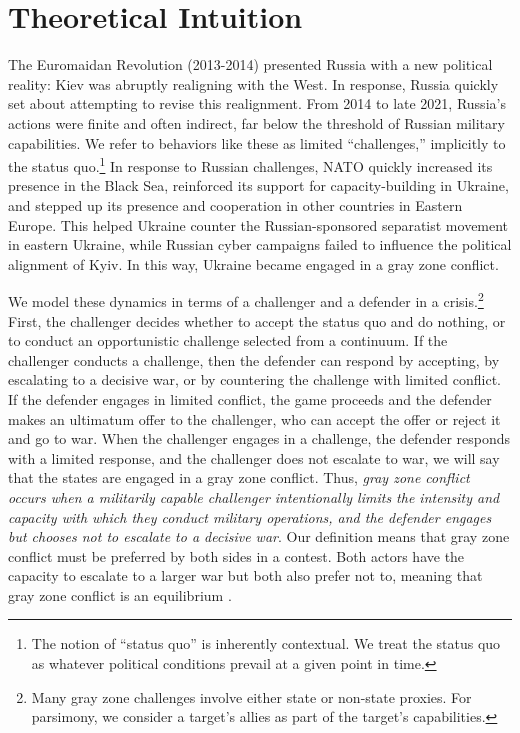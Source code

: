 \documentclass[11pt,letterpaper,pdftex,dvipsnames,table]{article}
\begin{document}
\section{Theoretical Intuition} \label{formalintutition}
The Euromaidan Revolution (2013-2014) presented Russia with a new political reality: Kiev was abruptly realigning with the West. In response, Russia quickly set about attempting to revise this realignment. From 2014 to late 2021, Russia's actions were finite and often indirect, far below the threshold of Russian military capabilities. We refer to behaviors like these as limited ``challenges,'' implicitly to the status quo.\footnote{The notion of ``status quo'' is inherently contextual. We treat the status quo as whatever political conditions prevail at a given point in time.} In response to Russian challenges, NATO quickly increased its presence in the Black Sea, reinforced its support for capacity-building in Ukraine, and stepped up its presence and cooperation in other countries in Eastern Europe. This helped Ukraine counter the Russian-sponsored separatist movement in eastern Ukraine, while Russian cyber campaigns failed to influence the political alignment of Kyiv. In this way, Ukraine became engaged in a gray zone conflict.

We model these dynamics in terms of a challenger and a defender in a crisis.\footnote{Many gray zone challenges involve either state or non-state proxies. For parsimony, we consider a target's allies as part of the target's capabilities.} First, the challenger decides whether to accept the status quo and do nothing, or to conduct an opportunistic challenge selected from a continuum. If the challenger conducts a challenge, then the defender can respond by accepting, by escalating to a decisive war, or by countering the challenge with limited conflict. If the defender engages in limited conflict, the game proceeds and the defender makes an ultimatum offer to the challenger, who can accept the offer or reject it and go to war. When the challenger engages in a challenge, the defender responds with a limited response, and the challenger does not escalate to war, we will say that the states are engaged in a gray zone conflict. Thus, \textit{gray zone conflict occurs when a militarily capable challenger intentionally limits the intensity and capacity with which they conduct military operations, and the defender engages but chooses not to escalate to a decisive war}. Our definition means that gray zone conflict must be preferred by both sides in a contest. Both actors have the capacity to escalate to a larger war but both also prefer not to, meaning that gray zone conflict is an equilibrium \citep{carson_facingsavingface_2016}.
\end{document}
